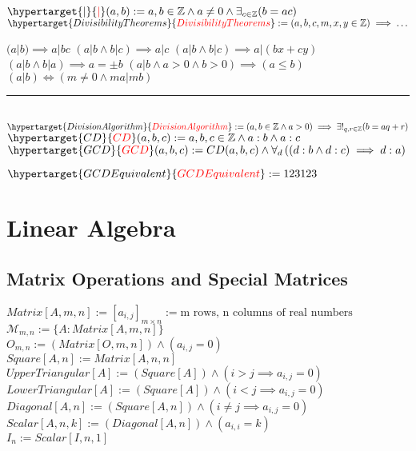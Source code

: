 \documentclass{book}
\newcommand{\df}[1]{\hypertarget{#1}{\textcolor{red}{#1}}}
\newcommand{\abr}{:=}
\newcommand{\pr}[1]{\left(#1\right)}
\begin{document}
$\df{|}(a, b) \abr a, b \in \mathbb{Z} \land a \neq 0 \land \exists_{c \in \mathbb{Z}}(b = a c)$ \\

$\df{Divisibility Theorems} \abr (a, b, c, m, x, y \in \mathbb{Z}) \implies \ldots$
\begin{enumerate}
  \lit $(a | b) \implies a | b c$
  \lit $(a | b \land b | c) \implies a | c$
  \lit $(a | b \land b | c) \implies a | (b x + c y)$
  \lit $(a | b \land b | a) \implies a = \pm b$
  \lit $(a | b \land a > 0 \land b > 0) \implies (a \leq b)$
  \lit $(a | b) \iff (m \neq 0 \land m a | m b)$
\end{enumerate} \vspace{.75mm} \hrule \vspace{.75mm} \ \\ 

$\df{Division Algorithm} \abr (a, b \in \mathbb{Z} \land a > 0) \implies \exists!_{q, r \in \mathbb{Z}}(b = a q + r)$ \\

$\df{CD}(a, b, c) \abr a, b, c \in \mathbb{Z} \land a : b \land a : c$ \\
$\df{GCD}(a, b, c) \abr CD(a, b, c) \land \forall_{d}\pr{(d : b \land d : c) \implies d : a}$

$\df{GCD Equivalent} \abr 123123$

\chapter{Linear Algebra} %

\section{Matrix Operations and Special Matrices}
$Matrix[A, m, n] \abr [a_{i, j}]_{m \times n} \abr \text{m rows, n columns of real numbers}$ \\
$\mathcal{M}_{m, n} \abr \{A : Matrix[A, m, n]\}$ \\
$O_{m, n} \abr (Matrix[O, m, n]) \land (a_{i, j} = 0)$ \\
$Square[A, n] \abr Matrix[A, n, n]$ \\
$UpperTriangular[A] \abr (Square[A]) \land (i > j \implies a_{i, j} = 0)$ \\
$LowerTriangular[A] \abr (Square[A]) \land (i < j \implies a_{i, j} = 0)$ \\
$Diagonal[A, n] \abr (Square[A, n]) \land (i \neq j \implies a_{i, j} = 0)$ \\
$Scalar[A, n, k] \abr (Diagonal[A, n]) \land (a_{i, i} = k)$ \\
$I_n \abr Scalar[I, n, 1]$ \\
\end{document}
